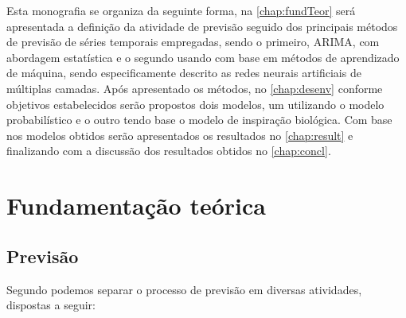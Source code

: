 \documentclass[
    12pt,
    oneside,
    a4paper,
    english,
    brazil
]{abntex2}
\begin{document}


Esta monografia se organiza da seguinte forma, na \autoref{chap:fundTeor} será
apresentada a definição da atividade de previsão seguido dos principais métodos
de previsão de séries temporais empregadas, sendo o primeiro, ARIMA, com
abordagem estatística e o segundo usando com base em métodos de aprendizado de
máquina, sendo especificamente descrito as redes neurais artificiais de
múltiplas camadas. Após apresentado os métodos, no \autoref{chap:desenv}
conforme objetivos estabelecidos serão propostos dois modelos, um utilizando o
modelo probabilístico e o outro tendo base o modelo de inspiração biológica.
Com base nos modelos obtidos serão apresentados os resultados no
\autoref{chap:result} e finalizando com a discussão dos resultados obtidos no
\autoref{chap:concl}.

\chapter{Fundamentação teórica}\label{chap:fundTeor}

\section{Previsão}
Segundo  podemos separar o processo de previsão em diversas
atividades, dispostas a seguir:
\end{document}
